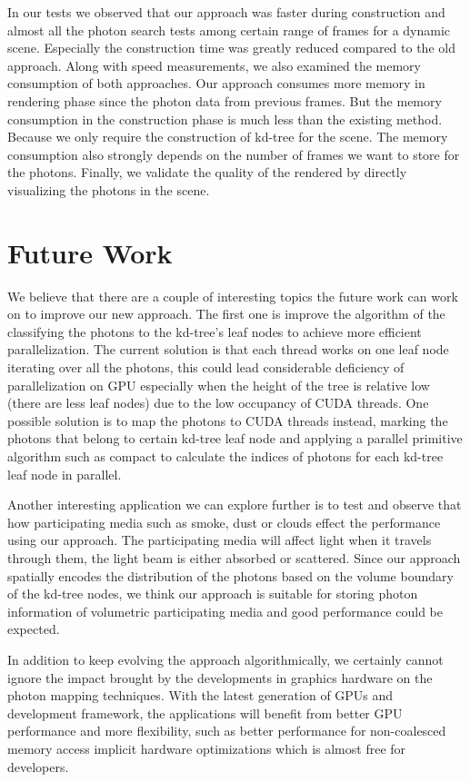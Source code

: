 In our tests we observed that our approach was faster during construction and almost all the photon search tests among certain range of frames for a dynamic scene. Especially the construction time was greatly reduced compared to the old approach. Along with speed measurements, we also examined the memory consumption of both approaches. Our approach consumes more memory in rendering phase since the photon data from previous frames. But the memory consumption in the construction phase is much less than the existing method. Because we only require the construction of kd-tree for the scene. The memory consumption also strongly depends on the number of frames we want to store for the photons. Finally, we validate the quality of the rendered by directly visualizing the photons in the scene.

\section{Future Work}

We believe that there are a couple of interesting topics the future work can work on to improve our new approach. The first one is improve the algorithm of the classifying the photons to the kd-tree's leaf nodes to achieve more efficient parallelization. The current solution is that each thread works on one leaf node iterating over all the photons, this could lead considerable deficiency of parallelization on GPU especially when the height of the tree is relative low (there are less leaf nodes) due to the low occupancy of CUDA threads. One possible solution is to map the photons to CUDA threads instead, marking the photons that belong  to certain kd-tree leaf node and applying a parallel primitive algorithm such as compact to calculate the indices of photons for each kd-tree leaf node in parallel.

Another interesting application we can explore further is to test and observe that how participating media such as smoke, dust or clouds effect the performance using our approach. The participating media will affect light when it travels through them, the light beam is either absorbed or scattered. Since our approach spatially encodes the distribution of the photons based on the volume boundary of the kd-tree nodes, we think our approach is suitable for storing photon information of volumetric participating media and good performance could be expected.

In addition to keep evolving the approach algorithmically, we certainly cannot ignore the impact brought by the developments in graphics hardware on the photon mapping techniques. With the latest generation of GPUs and development framework, the applications will benefit from better GPU performance and more flexibility, such as better performance for non-coalesced memory access implicit hardware optimizations which is almost free for developers. 